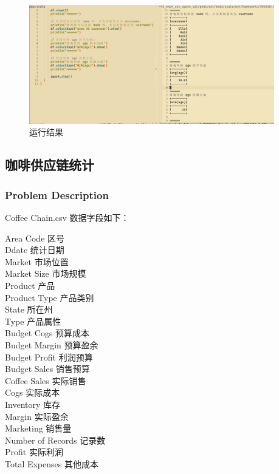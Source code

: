 \documentclass{article}
\begin{document}
\begin{figure}[H]
  \begin{center}
    \includegraphics[width=0.95\textwidth]{./figures/1-3.png}
  \end{center}
  \caption{运行结果}
\end{figure}


\subsection{咖啡供应链统计}
\subsubsection{Problem Description}
Coffee Chain.csv 数据字段如下：

\noindent Area Code 区号 \\
Ddate 统计日期 \\
Market 市场位置 \\
Market Size 市场规模 \\
Product 产品 \\
Product Type 产品类别 \\
State 所在州 \\
Type 产品属性 \\
Budget Cogs 预算成本 \\
Budget Margin 预算盈余 \\
Budget Profit 利润预算 \\
Budget Sales 销售预算 \\
Coffee Sales 实际销售 \\
Cogs 实际成本 \\
Inventory 库存 \\
Margin 实际盈余 \\
Marketing 销售量 \\
Number of Records 记录数 \\
Profit 实际利润 \\
Total Expenses 其他成本 \\
\end{document}
